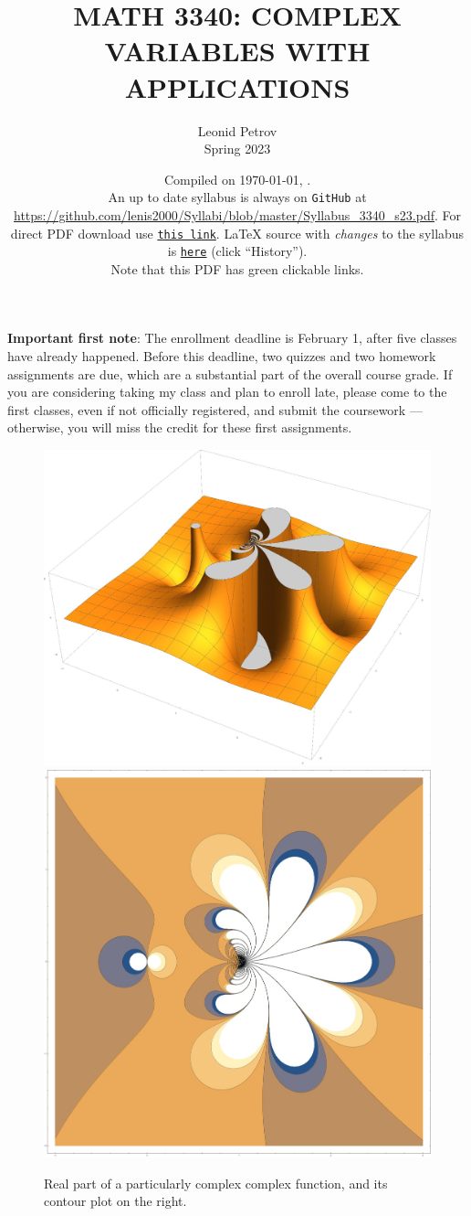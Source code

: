 \documentclass[oneside,11pt]{amsart}
\begin{document}
\title[MATH 3340: COMPLEX VARIABLES WITH APPLICATIONS]{MATH 3340: COMPLEX VARIABLES WITH APPLICATIONS}
\author{Leonid Petrov\\Spring 2023}
\date{Compiled on \today, \currenttime{}.\\An up to date syllabus is always on \texttt{GitHub} at \url{https://github.com/lenis2000/Syllabi/blob/master/Syllabus_3340_s23.pdf}. For direct PDF download use \href{https://github.com/lenis2000/Syllabi/raw/master/Syllabus_3340_s23.pdf}{\texttt{this link}}.
	\LaTeX{} source with \textit{changes} to the syllabus is \href{https://github.com/lenis2000/Syllabi/blob/master/Syllabus_3340_s23.tex}{\texttt{here}}
(click ``History'').
\\Note that this PDF has green clickable links.}
\maketitle

\textbf{Important first note}: The enrollment deadline is February 1, after five classes have already happened. Before this deadline, two quizzes and two homework assignments are due, which are a substantial part of the overall course grade. If you are considering taking my class and plan to enroll late, please come to the first classes, even if not officially registered, and submit the coursework --- otherwise, you will miss the credit for these first assignments.

\begin{figure}[h]
	\includegraphics[height=.4\textwidth]{img/complex_f.jpg}
	\qquad 
	\includegraphics[height=.4\textwidth]{img/complex_f2.jpg}
	\caption{Real part of a particularly complex complex function, and 
	its contour plot on the right.}
\end{figure}
\end{document}
